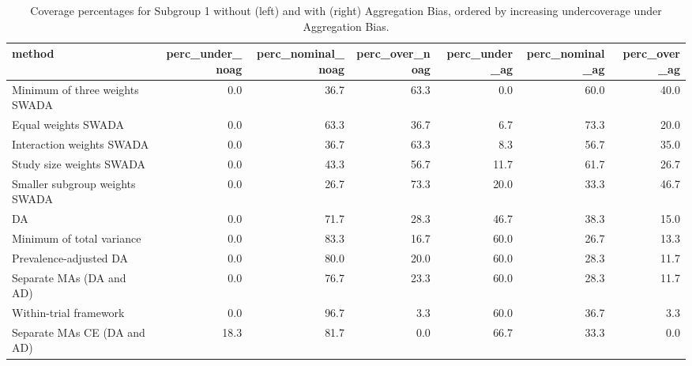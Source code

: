 \begin{table}[ht]
\centering
\begin{tabular}{lrrrrrr}
  \hline
method & perc_under_noag & perc_nominal_noag & perc_over_noag & perc_under_ag & perc_nominal_ag & perc_over_ag \\ 
  \hline
Minimum of three weights SWADA & 0.0 & 36.7 & 63.3 & 0.0 & 60.0 & 40.0 \\ 
  Equal weights SWADA & 0.0 & 63.3 & 36.7 & 6.7 & 73.3 & 20.0 \\ 
  Interaction weights SWADA & 0.0 & 36.7 & 63.3 & 8.3 & 56.7 & 35.0 \\ 
  Study size weights SWADA & 0.0 & 43.3 & 56.7 & 11.7 & 61.7 & 26.7 \\ 
  Smaller subgroup weights SWADA & 0.0 & 26.7 & 73.3 & 20.0 & 33.3 & 46.7 \\ 
  DA & 0.0 & 71.7 & 28.3 & 46.7 & 38.3 & 15.0 \\ 
  Minimum of total variance & 0.0 & 83.3 & 16.7 & 60.0 & 26.7 & 13.3 \\ 
  Prevalence-adjusted DA & 0.0 & 80.0 & 20.0 & 60.0 & 28.3 & 11.7 \\ 
  Separate MAs (DA and AD) & 0.0 & 76.7 & 23.3 & 60.0 & 28.3 & 11.7 \\ 
  Within-trial framework & 0.0 & 96.7 & 3.3 & 60.0 & 36.7 & 3.3 \\ 
  Separate MAs CE (DA and AD) & 18.3 & 81.7 & 0.0 & 66.7 & 33.3 & 0.0 \\ 
   \hline
\end{tabular}
\caption{Coverage percentages for Subgroup 1 without (left) and with (right) Aggregation Bias, ordered by increasing undercoverage under Aggregation Bias.} 
\label{tab:coverage_side_by_side}
\end{table}
